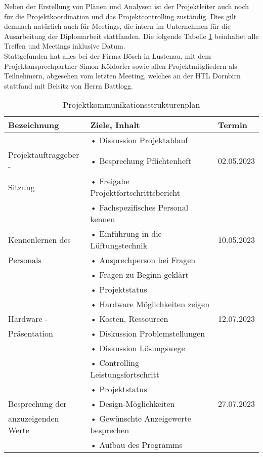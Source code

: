 Neben der Erstellung von Plänen und Analysen ist der Projektleiter auch noch für die Projektkoordination und das Projektcontrolling zuständig. Dies gilt demnach natürlich auch für Meetings, die intern im Unternehmen für die Ausarbeitung der Diplomarbeit stattfanden. Die folgende Tabelle \ref{tab:strukturenplan} beinhaltet alle Treffen und Meetings inklusive Datum. \\
Stattgefunden hat alles bei der Firma Bösch in Lustenau, mit dem Projektansprechpartner Simon Köldorfer sowie allen Projektmitgliedern als Teilnehmern, abgesehen vom letzten Meeting, welches an der HTL Dornbirn stattfand mit Beisitz von Herrn Battlogg.

\begin{table}[H]
	\caption{Projektkommunikationsstrukturenplan}
	\label{tab:strukturenplan}
	\centering
	\begin{tabular}{p{} | p{} | p{}}
		\toprule
		\textbf{Bezeichnung} & \textbf{Ziele, Inhalt} & \textbf{Termin} \\
		\midrule
			& • Diskussion Projektablauf & \\
		      Projektauftraggeber - &  • Besprechung Pflichtenheft  & 02.05.2023 \\
 			 Sitzung & • Freigabe Projektfortschrittsbericht & \\
 		\midrule
 			& • Fachspezifisches Personal kennen & \\
 		    Kennenlernen des & • Einführung in die Lüftungstechnik & 10.05.2023 \\
 			Personals	& • Ansprechperson bei Fragen & \\
 			& • Fragen zu Beginn geklärt & \\
 		\midrule
 			& •	Projektstatus & \\
 			& •	Hardware Möglichkeiten zeigen & \\
 		    Hardware -	& • Kosten, Ressourcen & 12.07.2023 \\ 
 			Präsentation & • Diskussion Problemstellungen & \\
 			& • Diskussion Lösungswege & \\
 			& •	Controlling Leistungsfortschritt & \\
 		\midrule
 			& •	Projektstatus & \\
 		Besprechung der & •	Design-Möglichkeiten & 27.07.2023 \\
 		anzuzeigenden Werte & •	Gewünschte Anzeigewerte besprechen & \\
 			& • Aufbau des Programms  & \\

\end{tabular}
\end{table}
